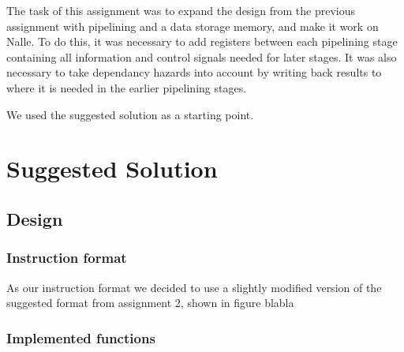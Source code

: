 \documentclass[11pt]{report}
\begin{document}
The task of this assignment was to expand the design from the previous
assignment with pipelining and a data storage memory, and make it work
on Nalle. To do this, it
was necessary to add registers between each pipelining stage containing
all information and control signals needed for later stages. It was also
necessary to take dependancy hazards into account by writing back results
to where it is needed in the earlier pipelining stages. 

We used the suggested solution as a starting point. %

\section*{Suggested Solution}


\subsection*{Design}

\subsubsection*{Instruction format}
As our instruction format we decided to use a slightly modified version of the
suggested format from assignment 2, shown in figure blabla %
\subsubsection*{Implemented functions}
\end{document}
